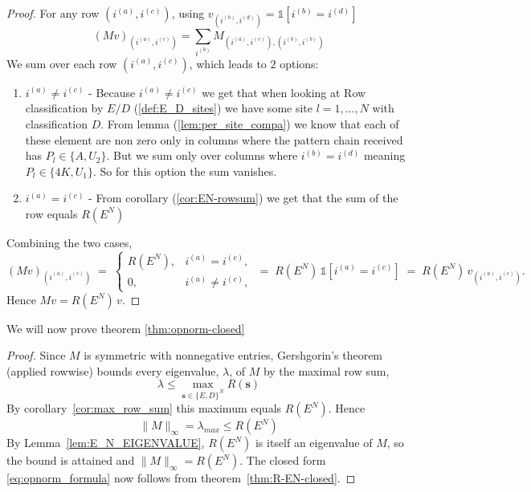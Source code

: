 \documentclass[12pt,a4paper]{article}
\begin{document}
\begin{proof}
For any row $(i^{(a)},i^{(c)})$, using $v_{(i^{(b)},i^{(d)})}=\mathbb{1}[i^{(b)}=i^{(d)}]$
\begin{equation}\label{eq:Mv-is-Gsq}
(Mv)_{(i^{(a)},i^{(c)})}
=\sum_{i^{(b)}}M_{(i^{(a)},i^{(c)}),(i^{(b)},i^{(b)})}
\end{equation}
We sum over each row $(i^{(a)},i^{(c)})$, which leads to $2$ options:

 \begin{enumerate}
     \item $i^{(a)}\neq i^{(c)}$ - Because $i^{(a)}\not=i^{(c)}$  we get that when looking at Row classification by $E/D$ (\ref{def:E_D_sites}) we have some site $l=1,...,N$  with classification $D$. From lemma (\ref{lem:per_site_compa}) we know that each of these element are non zero only in columns where the pattern chain received has $P_l\in\{A,U_2\}$. But we sum only over columns where $i^{(b)}=i^{(d)}$  meaning $P_l\in\{4K,U_1\}$. So for this option the sum vanishes.
\item $i^{(a)}=i^{(c)}$ - From corollary (\ref{cor:EN-rowsum}) we get that the sum of the row equals $R(E^N)$
\end{enumerate}

Combining the two cases,
\[
(Mv)_{(i^{(a)},i^{(c)})}
\;=\;
\begin{cases}
R(E^N), & i^{(a)}=i^{(c)},\\[2pt]
0,      & i^{(a)}\neq i^{(c)},
\end{cases}
\;=\;
R(E^N)\,\mathbb{1}\!\left[i^{(a)}=i^{(c)}\right]
\;=\;
R(E^N)\,v_{(i^{(a)},i^{(c)})}.
\]
Hence $Mv = R(E^N)\,v$.
\end{proof}
We will now prove theorem \ref{thm:opnorm-closed}
\begin{proof}
Since $M$ is symmetric with nonnegative entries, Gershgorin's theorem (applied
rowwise) bounds every eigenvalue, $\lambda$, of $M$ by the maximal row sum,
$$\lambda \le \max_{\mathbf{s}\in\{E,D\}^N} R(\mathbf{s})$$
By corollary~\ref{cor:max_row_sum} this maximum equals $R(E^N)$.
Hence
$$\|M\|_\infty = \lambda_{max} \le R(E^N)$$
By Lemma~\ref{lem:E_N_EIGENVALUE}, $R(E^N)$ is itself an eigenvalue of $M$, so the bound
is attained and $\|M\|_\infty = R(E^N)$.
The closed form \eqref{eq:opnorm_formula} now follows from theorem~\ref{thm:R-EN-closed}.
\end{proof}
\end{document}
